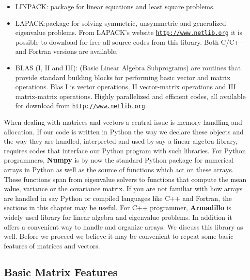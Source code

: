 \documentclass[%
oneside,                 %
final,                   %
10pt]{article}
\begin{document}
\begin{itemize}
  \item LINPACK: package for linear equations and least square problems.

  \item LAPACK:package for solving symmetric, unsymmetric and generalized eigenvalue problems. From LAPACK's website \href{{http://www.netlib.org}}{\nolinkurl{http://www.netlib.org}} it is possible to download for free all source codes from this library. Both C/C++ and Fortran versions are available.

  \item BLAS (I, II and III): (Basic Linear Algebra Subprograms) are routines that provide standard building blocks for performing basic vector and matrix operations. Blas I is vector operations, II vector-matrix operations and III matrix-matrix operations. Highly parallelized and efficient codes, all available for download from \href{{http://www.netlib.org}}{\nolinkurl{http://www.netlib.org}}.
\end{itemize}

\noindent
When dealing with matrices and vectors a central issue is memory
handling and allocation. If our code is written in Python the way we
declare these objects and the way they are handled, interpreted and
used by say a linear algebra library, requires codes that interface
our Python program with such libraries. For Python programmers,
\textbf{Numpy} is by now the standard Python package for numerical arrays in
Python as well as the source of functions which act on these
arrays. These functions span from eigenvalue solvers to functions that
compute the mean value, variance or the covariance matrix. If you are
not familiar with how arrays are handled in say Python or compiled
languages like C++ and Fortran, the sections in this chapter may be
useful. For C++ programmer, \textbf{Armadillo} is widely used library for
linear algebra and eigenvalue problems. In addition it offers a
convenient way to handle and organize arrays. We discuss this library
as well.   Before we proceed we believe  it may be convenient to repeat some basic features of 
 matrices and vectors.


\subsection{Basic Matrix Features}


\end{document}
